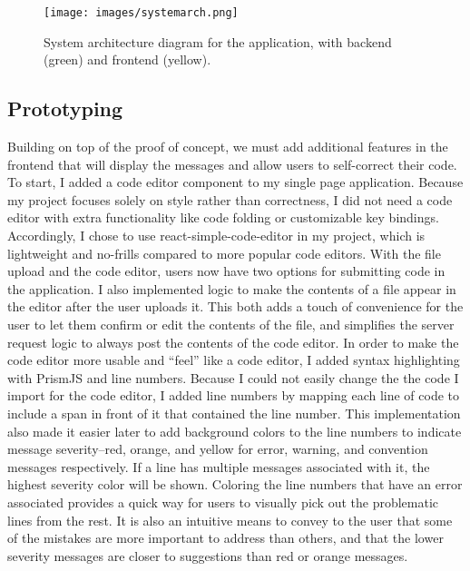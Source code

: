 \documentclass[10pt,twocolumn]{article}
\begin{document}
\begin{figure}
\texttt{[image: images/systemarch.png]}
\centering
\vspace{.5cm}
\caption{System architecture diagram for the application, with backend (green) and frontend (yellow).}
\end{figure}

\subsection{Prototyping}
Building on top of the proof of concept, we must add additional features in the frontend that will display the messages and allow users to self-correct their code. 
To start, I added a code editor component to my single page application. 
Because my project focuses solely on style rather than correctness, I did not need a code editor with extra functionality like code folding or customizable key bindings. 
Accordingly, I chose to use react-simple-code-editor \cite{react-simple-code-editor} in my project, which is lightweight and no-frills compared to more popular code editors. 
With the file upload and the code editor, users now have two options for submitting code in the application. 
I also implemented logic to make the contents of a file appear in the editor after the user uploads it. 
This both adds a touch of convenience for the user to let them confirm or edit the contents of the file, and simplifies the server request logic to always post the contents of the code editor. 
In order to make the code editor more usable and “feel” like a code editor, I added syntax highlighting with PrismJS \cite{prismjs} and line numbers. 
Because I could not easily change the the code I import for the code editor, I added line numbers by mapping each line of code to include a span in front of it that contained the line number.
This implementation also made it easier later to add background colors to the line numbers to indicate message severity--red, orange, and yellow for error, warning, and convention messages respectively. 
If a line has multiple messages associated with it, the highest severity color will be shown. 
Coloring the line numbers that have an error associated provides a quick way for users to visually pick out the problematic lines from the rest. 
It is also an intuitive means to convey to the user that some of the mistakes are more important to address than others, and that the lower severity messages are closer to suggestions than red or orange messages. 
\end{document}
